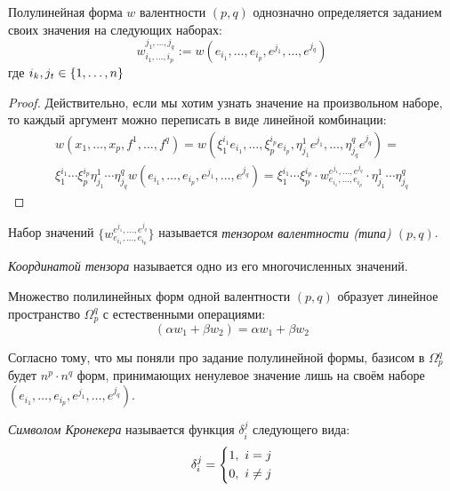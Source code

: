 \begin{proposition}
	Полулинейная форма $w$ валентности $(p, q)$ однозначно определяется заданием своих значения на следующих наборах:
	\[
		w_{i_1, \ldots, i_p}^{j_1, \ldots, j_q} := w(e_{i_1}, \ldots, e_{i_p}, e^{j_1}, \ldots, e^{j_q})
	\]
	где $i_k, j_t \in \{1, \ldots, n\}$
\end{proposition}

\begin{proof}
	Действительно, если мы хотим узнать значение на произвольном наборе, то каждый аргумент можно переписать в виде линейной комбинации:
	\begin{multline*}
		w(x_1, \ldots, x_p, f^1, \ldots, f^q) = w(\xi_1^{i_1} e_{i_1}, \ldots, \xi_p^{i_p} e_{i_p}, \eta_{j_1}^1 e^{j_1}, \ldots, \eta_{j_q}^q e^{j_q}) =
		\\
		\xi_1^{i_1} \cdots \xi_p^{i_p} \eta_{j_1}^1 \cdots \eta_{j_q}^q w(e_{i_1}, \ldots, e_{i_p}, e^{j_1}, \ldots, e^{j_q}) = \xi_1^{i_1} \cdots \xi_p^{i_p} \cdot w_{e_{i_1}, \ldots, e_{i_p}}^{e^{j_1}, \ldots, e^{j_q}} \cdot \eta_{j_1}^1 \cdots \eta_{j_q}^q
	\end{multline*}
\end{proof}

\begin{definition}
	Набор значений $\{w_{e_{i_1}, \ldots, e_{i_p}}^{e^{j_1}, \ldots, e^{j_q}}\}$ называется \textit{тензором валентности (типа) $(p, q)$}.
\end{definition}

\begin{definition}
	\textit{Координатой тензора} называется одно из его многочисленных значений.
\end{definition}

\begin{definition}
	Множество полилинейных форм одной валентности $(p, q)$ образует линейное пространство $\Omega_p^q$ с естественными операциями:
	\[
		(\alpha w_1 + \beta w_2) = \alpha w_1 + \beta w_2
	\]
\end{definition}

\begin{note}
	Согласно тому, что мы поняли про задание полулинейной формы, базисом в $\Omega_p^q$ будет $n^p \cdot n^q$ форм, принимающих ненулевое значение лишь на своём наборе $(e_{i_1}, \ldots, e_{i_p}, e^{j_1}, \ldots, e^{j_q})$.
\end{note}

\begin{definition}
	\textit{Символом Кронекера} называется функция $\delta_i^j$ следующего вида:
	\[
		\delta_i^j = \left\{\begin{aligned}
			&{1,\ i = j}
			\\
			&{0,\ i \neq j}
		\end{aligned}\right.
	\]
\end{definition}

